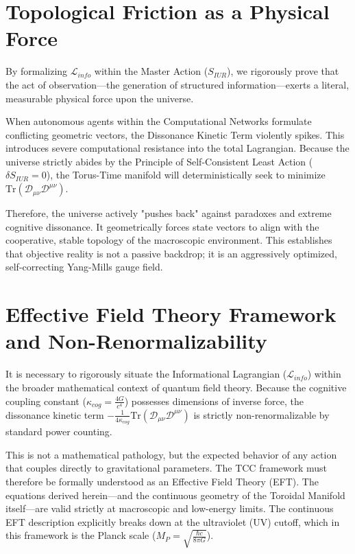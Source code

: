 \documentclass[12pt,openany]{book}
\theoremstyle{plain}
\theoremstyle{definition}
\theoremstyle{remark}
\begin{document}
\section{Topological Friction as a Physical Force}

By formalizing $\mathcal{L}_{info}$ within the Master Action ($S_{IUR}$), we rigorously prove that the act of observation—the generation of structured information—exerts a literal, measurable physical force upon the universe. 

When autonomous agents within the Computational Networks formulate conflicting geometric vectors, the Dissonance Kinetic Term violently spikes. This introduces severe computational resistance into the total Lagrangian. Because the universe strictly abides by the Principle of Self-Consistent Least Action ($\delta S_{IUR} = 0$), the Torus-Time manifold will deterministically seek to minimize $\text{Tr}(\mathcal{D}_{\mu\nu} \mathcal{D}^{\mu\nu})$. 

Therefore, the universe actively "pushes back" against paradoxes and extreme cognitive dissonance. It geometrically forces state vectors to align with the cooperative, stable topology of the macroscopic environment. This establishes that objective reality is not a passive backdrop; it is an aggressively optimized, self-correcting Yang-Mills gauge field.

\section{Effective Field Theory Framework and Non-Renormalizability}

It is necessary to rigorously situate the Informational Lagrangian ($\mathcal{L}_{info}$) within the broader mathematical context of quantum field theory. Because the cognitive coupling constant ($\kappa_{cog} = \frac{4G}{c^4}$) possesses dimensions of inverse force, the dissonance kinetic term $-\frac{1}{4\kappa_{cog}}\text{Tr}(\mathcal{D}_{\mu\nu}\mathcal{D}^{\mu\nu})$ is strictly non-renormalizable by standard power counting.

This is not a mathematical pathology, but the expected behavior of any action that couples directly to gravitational parameters. The TCC framework must therefore be formally understood as an Effective Field Theory (EFT). The equations derived herein---and the continuous geometry of the Toroidal Manifold itself---are valid strictly at macroscopic and low-energy limits. The continuous EFT description explicitly breaks down at the ultraviolet (UV) cutoff, which in this framework is the Planck scale ($M_P = \sqrt{\frac{\hbar c}{8\pi G}}$).
\end{document}
